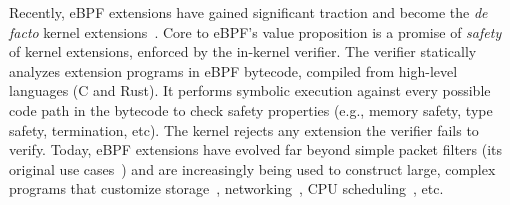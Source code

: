 Recently, eBPF extensions have gained significant traction and
    become the {\it de facto}
    kernel extensions~\cite{cilium-docs,ebpf-windows}.
Core to eBPF's value proposition is a promise of {\it safety} of kernel extensions,
    enforced by the in-kernel verifier.
The verifier
    statically analyzes extension programs in eBPF bytecode,
    compiled from high-level languages (C and Rust).
It performs symbolic execution against every possible code path in the bytecode
    to check safety properties (e.g.,
    memory safety, type safety, termination, etc).
The kernel rejects any extension the verifier fails to verify.
Today, eBPF extensions have evolved far beyond simple packet filters (its original use cases~\cite{pf,bsdpf})
    and are increasingly being
    used to construct large, complex programs that customize storage~\cite{BMC,Zhong:osdi:2022,fetchbpf,lambda-io},
    networking~\cite{Electrode,DINT},
    CPU scheduling~\cite{ghost-scheduler,ghost-scheduler-lpc,sched-ext}, etc. %



